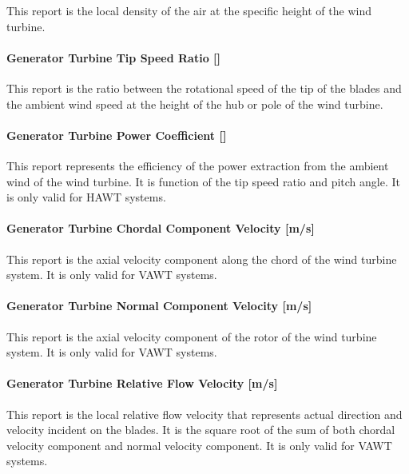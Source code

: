 This report is the local density of the air at the specific height of the wind turbine.

\paragraph{Generator Turbine Tip Speed Ratio {[]}}\label{generator-turbine-tip-speed-ratio}

This report is the ratio between the rotational speed of the tip of the blades and the ambient wind speed at the height of the hub or pole of the wind turbine.

\paragraph{Generator Turbine Power Coefficient {[]}}\label{generator-turbine-power-coefficient}

This report represents the efficiency of the power extraction from the ambient wind of the wind turbine. It is function of the tip speed ratio and pitch angle. It is only valid for HAWT systems.

\paragraph{Generator Turbine Chordal Component Velocity {[}m/s{]}}\label{generator-turbine-chordal-component-velocity-ms}

This report is the axial velocity component along the chord of the wind turbine system. It is only valid for VAWT systems.

\paragraph{Generator Turbine Normal Component Velocity {[}m/s{]}}\label{generator-turbine-normal-component-velocity-ms}

This report is the axial velocity component of the rotor of the wind turbine system. It is only valid for VAWT systems.

\paragraph{Generator Turbine Relative Flow Velocity {[}m/s{]}}\label{generator-turbine-relative-flow-velocity-ms}

This report is the local relative flow velocity that represents actual direction and velocity incident on the blades. It is the square root of the sum of both chordal velocity component and normal velocity component. It is only valid for VAWT systems.

